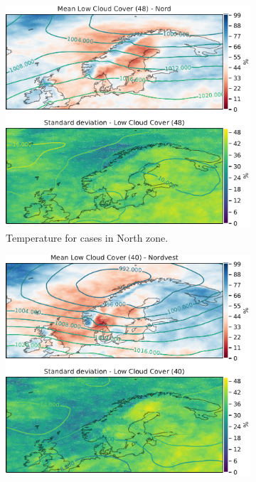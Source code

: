 \begin{figure}
\begin{subfigure}[b]{0.49\textwidth}
    \centering
    \includegraphics[width=\textwidth]{Figures/CCNord.pdf}
    \caption{Temperature for cases in North zone.}
    \label{fig:NordCC}
\end{subfigure}
\begin{subfigure}[b]{0.49\textwidth}
    \centering
    \includegraphics[width=\textwidth]{Figures/CCNordvest.pdf}

\end{subfigure}
\end{figure}
